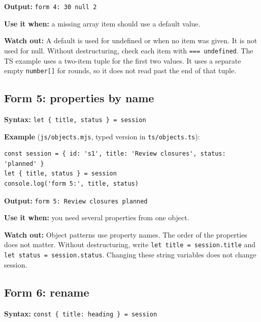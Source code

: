 \documentclass[
  10pt,
  a4paper,
]{article}
\begin{document}
\textbf{Output:} \texttt{form 4:\allowbreak{} 30 null 2}

\textbf{Use it when:} a missing array item should use a default value.

\textbf{Watch out:} A default is used for undefined or when no item was
given. It is not used for null. Without destructuring, check each item
with \texttt{=== undefined}. The TS example uses a two-item tuple for
the first two values. It uses a separate empty \texttt{number[]} for
rounds, so it does not read past the end of that tuple.

\subsection{Form 5: properties by name}\label{form-5-properties-by-name}

\textbf{Syntax:} \texttt{let \{ title, status \} = session}

\textbf{Example} (\texttt{js/\allowbreak{}objects.\allowbreak{}mjs},
typed version in \texttt{ts/\allowbreak{}objects.\allowbreak{}ts}):

\begin{minipage}{\linewidth}

\begin{lstlisting}
const session = { id: 's1', title: 'Review closures', status: 'planned' }
let { title, status } = session
console.log('form 5:', title, status)
\end{lstlisting}

\end{minipage}\par

\textbf{Output:} \texttt{form 5:\allowbreak{} Review closures planned}

\textbf{Use it when:} you need several properties from one object.

\textbf{Watch out:} Object patterns use property names. The order of the
properties does not matter. Without destructuring, write
\texttt{let title = session.\allowbreak{}title} and
\texttt{let status = session.\allowbreak{}status}. Changing these string
variables does not change session.

\subsection{Form 6: rename}\label{form-6-rename}

\textbf{Syntax:}
\texttt{const \{ title:\allowbreak{} heading \} = session}
\end{document}
